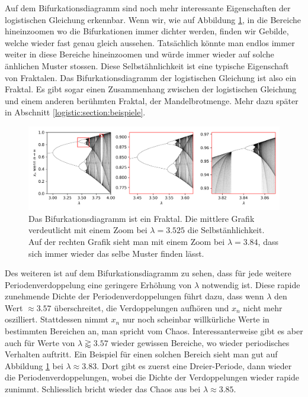 Auf dem Bifurkationsdiagramm sind noch mehr 
interessante Eigenschaften der logistischen Gleichung erkennbar.
Wenn wir, wie auf Abbildung \ref{fig:map_zoom}, in die Bereiche hineinzoomen
wo die Bifurkationen immer dichter werden, finden wir Gebilde, 
welche wieder fast genau gleich aussehen.
Tatsächlich könnte man endlos immer weiter in diese
Bereiche hineinzoomen und würde immer wieder auf solche änhlichen Muster stossen. 
Diese Selbstähnlichkeit ist eine typische Eigenschaft von Fraktalen.
Das Bifurkationsdiagramm der logistischen Gleichung ist also ein Fraktal.
Es gibt sogar einen Zusammenhang zwischen der logistischen Gleichung und 
einem anderen berühmten Fraktal, der Mandelbrotmenge.
Mehr dazu später in Abschnitt 
\ref{logistic:section:beispiele}.
\begin{figure}
    \includegraphics[width=\linewidth]{papers/logistic/figures/map_zoom.png}
    \caption{
        Das Bifurkationsdiagramm ist ein Fraktal.
        Die mittlere Grafik verdeutlicht mit einem Zoom 
        bei $\lambda = 3.525$ die Selbstänhlichkeit. 
        Auf der rechten Grafik sieht man mit einem
        Zoom bei $\lambda = 3.84$, dass sich immer
        wieder das selbe Muster finden lässt.
    }
    \label{fig:map_zoom}
\end{figure}

Des weiteren ist auf dem Bifurkationsdiagramm zu sehen,
dass für jede weitere Periodenverdoppelung eine geringere
Erhöhung von $\lambda$ notwendig ist.
Diese rapide zunehmende Dichte der Periodenverdoppelungen führt dazu, 
dass wenn $\lambda$ den Wert $\approx 3.57$ überschreitet, 
die Verdoppelungen aufhören und $x_n$ nicht mehr oszilliert. 
Stattdessen nimmt $x_n$ nur noch scheinbar 
willkürliche Werte in bestimmten Bereichen an, 
man spricht vom Chaos.
Interessanterweise gibt es aber auch für Werte von 
$\lambda \gtrapprox 3.57$ wieder gewissen Bereiche,
wo wieder periodisches Verhalten auftritt. 
Ein Beispiel für einen solchen Bereich sieht man
gut auf Abbildung \ref{fig:map_zoom} bei 
$\lambda \approx 3.83$. 
Dort gibt es zuerst eine Dreier-Periode, 
dann wieder die Periodenverdoppelungen, 
wobei die Dichte der Verdoppelungen
wieder rapide zunimmt.
Schliesslich bricht wieder das Chaos aus bei 
$\lambda \approx 3.85$.
